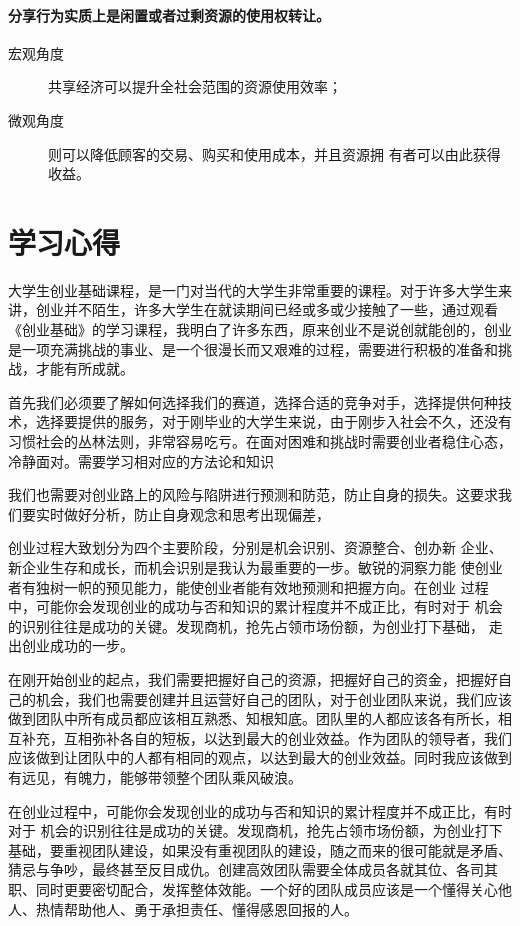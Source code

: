 \documentclass[UTF8]{article}
\begin{document}
\paragraph{分享行为实质上是闲置或者过剩资源的使用权转让。}
\begin{description}
 \item[宏观角度]共享经济可以提升全社会范围的资源使用效率；
 \item[微观角度]则可以降低顾客的交易、购买和使用成本，并且资源拥
有者可以由此获得收益。
\end{description}
\newpage
\section{学习心得}
大学生创业基础课程，是一门对当代的大学生非常重要的课程。对于许多大学生来讲，创业并不陌生，许多大学生在就读期间已经或多或少接触了一些，通过观看《创业基础》的学习课程，我明白了许多东西，原来创业不是说创就能创的，创业是一项充满挑战的事业、是一个很漫长而又艰难的过程，需要进行积极的准备和挑战，才能有所成就。

首先我们必须要了解如何选择我们的赛道，选择合适的竞争对手，选择提供何种技术，选择要提供的服务，对于刚毕业的大学生来说，由于刚步入社会不久，还没有习惯社会的丛林法则，非常容易吃亏。在面对困难和挑战时需要创业者稳住心态，冷静面对。需要学习相对应的方法论和知识

我们也需要对创业路上的风险与陷阱进行预测和防范，防止自身的损失。这要求我们要实时做好分析，防止自身观念和思考出现偏差，

创业过程大致划分为四个主要阶段，分别是机会识别、资源整合、创办新
企业、新企业生存和成长，而机会识别是我认为最重要的一步。敏锐的洞察力能
使创业者有独树一帜的预见能力，能使创业者能有效地预测和把握方向。在创业
过程中，可能你会发现创业的成功与否和知识的累计程度并不成正比，有时对于
机会的识别往往是成功的关键。发现商机，抢先占领市场份额，为创业打下基础，
走出创业成功的一步。 

在刚开始创业的起点，我们需要把握好自己的资源，把握好自己的资金，把握好自己的机会，我们也需要创建并且运营好自己的团队，对于创业团队来说，我们应该做到团队中所有成员都应该相互熟悉、知根知底。团队里的人都应该各有所长，相互补充，互相弥补各自的短板，以达到最大的创业效益。作为团队的领导者，我们应该做到让团队中的人都有相同的观点，以达到最大的创业效益。同时我应该做到有远见，有魄力，能够带领整个团队乘风破浪。

在创业过程中，可能你会发现创业的成功与否和知识的累计程度并不成正比，有时对于
机会的识别往往是成功的关键。发现商机，抢先占领市场份额，为创业打下基础，要重视团队建设，如果没有重视团队的建设，随之而来的很可能就是矛盾、猜忌与争吵，最终甚至反目成仇。创建高效团队需要全体成员各就其位、各司其职、同时更要密切配合，发挥整体效能。一个好的团队成员应该是一个懂得关心他人、热情帮助他人、勇于承担责任、懂得感恩回报的人。
\end{document}
